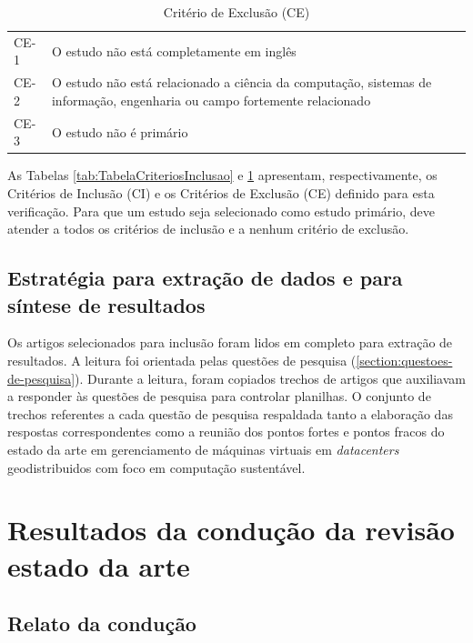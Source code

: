 \documentclass[
	12pt,				%
	oneside,			%
	a4paper,			%
	english,			%
	brazil				%
	]{abntex2ppgsi}
\begin{document}
\begin{apendicesenv}
\begin{table}[htbp]
	\centering
	\caption{Critério de Exclusão (CE)}
		\begin{tabular}{p{1in} p{5in} } \hline

		CE-1	& O estudo não está completamente em inglês \\
		CE-2	& O estudo não está relacionado a ciência da computação, sistemas de informação, engenharia ou campo fortemente relacionado \\
		CE-3	& O estudo não é primário \\ \hline

		\end{tabular}
	\label{tab:TabelaCriteriosExclusao}
\end{table}

As Tabelas \ref{tab:TabelaCriteriosInclusao} e \ref{tab:TabelaCriteriosExclusao} apresentam, respectivamente, os Critérios de Inclusão (CI) e os Critérios de Exclusão (CE) definido para esta verificação. Para que um estudo seja selecionado como estudo primário, deve atender a todos os critérios de inclusão e a nenhum critério de exclusão.

\section{Estratégia para extração de dados e para síntese de resultados}\label{section:estrategia-para-extracao-de-dados-e-para-sintese-de-resultados}

Os artigos selecionados para inclusão foram lidos em completo para extração de resultados. A leitura foi orientada pelas questões de pesquisa (\ref{section:questoes-de-pesquisa}). Durante a leitura, foram copiados trechos de artigos que auxiliavam a responder às questões de pesquisa para controlar planilhas. O conjunto de trechos referentes a cada questão de pesquisa respaldada tanto a elaboração das respostas correspondentes como a reunião dos pontos fortes e pontos fracos do estado da arte em gerenciamento de máquinas virtuais em \textit{datacenters} geodistribuidos com foco em computação sustentável.

\chapter{Resultados da condução da revisão estado da arte}

\section{Relato da condução}\label{section:relato-da-conducao}


\end{apendicesenv}
\end{document}
